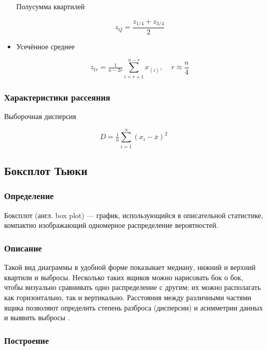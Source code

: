\documentclass[report.tex]{subfiles}
\begin{document}
\begin{itemize}
  Полусумма квартилей
  
  \begin{equation} \label{eq:zQ}
    z_Q = \dfrac{z_{1/4} + z_{3/4}}{2}
  \end{equation}
  
  \item Усечённое среднее
  
  \begin{equation} \label{eq:zTr}
    z_{tr} = \tfrac{1}{n-2r}\sum\limits_{i=r+1}^{n-r} x_{(i)}, \;\;\;\; r \approx \dfrac{n}{4}
  \end{equation}
  
\end{itemize}

\subsubsection{Характеристики рассеяния}

Выборочная дисперсия

\begin{equation}
    D = \tfrac{1}{n}\sum\limits_{i=1}^{n} (x_i - \overline{x})^2
\end{equation}

\subsection{Боксплот Тьюки}

\subsubsection{Определение}

Боксплот (англ. box plot) --- график, использующийся в описательной статистике, компактно изображающий одномерное распределение вероятностей.

\subsubsection{Описание}

Такой вид диаграммы в удобной форме показывает медиану, нижний и верхний квартили и выбросы. Несколько таких ящиков можно нарисовать бок о бок, чтобы визуально сравнивать одно распределение с другим; их можно располагать как горизонтально, так и вертикально. Расстояния между различными частями ящика позволяют определить степень разброса (дисперсии) и асимметрии данных и выявить выбросы \cite{s:boxplot}. 

\subsubsection{Построение}
\end{document}
